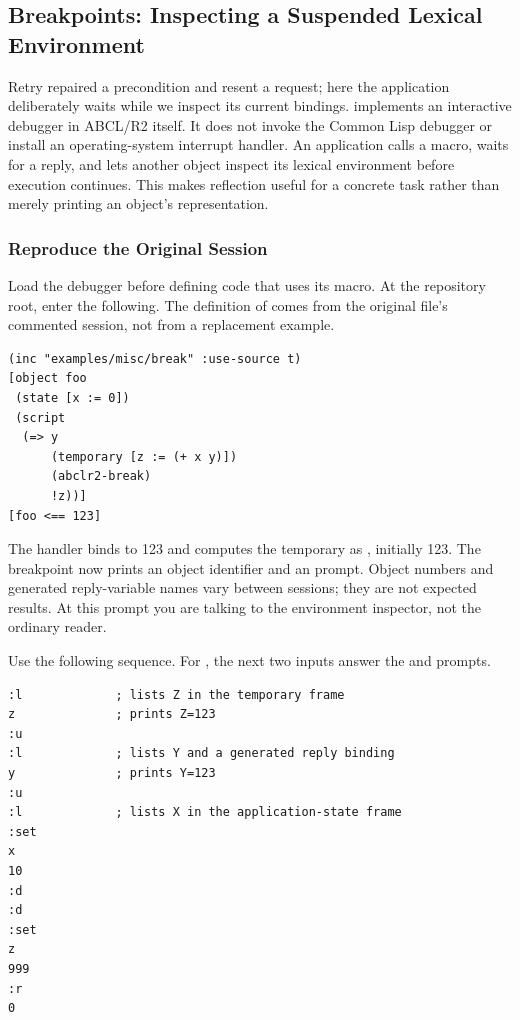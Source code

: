 \subsection{Breakpoints: Inspecting a Suspended Lexical Environment}
\label{sec:break}

Retry repaired a precondition and resent a request; here the application
deliberately waits while we inspect its current bindings.
 implements an interactive debugger
in ABCL/R2 itself. It does not invoke the Common Lisp debugger or install
an operating-system interrupt handler. An application calls a macro,
waits for a reply, and lets another object inspect its lexical environment
before execution continues. This makes reflection useful for a concrete
task rather than merely printing an object's representation.

\subsubsection{Reproduce the Original Session}

Load the debugger before defining code that uses its macro. At the repository
root, enter the following. The definition of  comes from the
original file's commented session, not from a replacement example.

\begin{codeblock}
\begin{lstlisting}
(inc "examples/misc/break" :use-source t)
[object foo
 (state [x := 0])
 (script
  (=> y
      (temporary [z := (+ x y)])
      (abclr2-break)
      !z))]
[foo <== 123]
\end{lstlisting}
\end{codeblock}

The handler binds  to 123 and computes the temporary 
as , initially 123. The breakpoint now prints an object
identifier and an  prompt. Object numbers and generated
reply-variable names vary between sessions; they are not expected results.
At this prompt you are talking to the environment inspector, not the
ordinary  reader.

Use the following sequence. For , the next two inputs answer
the  and  prompts.

\begin{codeblock}
\begin{lstlisting}
:l             ; lists Z in the temporary frame
z              ; prints Z=123
:u
:l             ; lists Y and a generated reply binding
y              ; prints Y=123
:u
:l             ; lists X in the application-state frame
:set
x
10
:d
:d
:set
z
999
:r
0
\end{lstlisting}
\end{codeblock}

